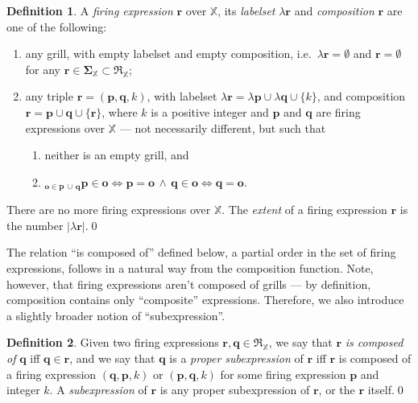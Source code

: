 \documentclass [a4paper,12pt] {article}
\theoremstyle{definition}
\newtheorem{definition}{Definition}[section]
\newcommand{\Forall}{}
\DeclareRobustCommand{\Forall}{\displaystyle\mathop{\textstyle\mathlarger{\forall}}}
\newcommand{\composition}{}
\DeclareRobustCommand{\composition}{\mathop{\textstyle\mathsmaller{\bf {Com}}}}
\begin{document}
\begin {definition}\label{def-expression}
  A {\em firing expression} $\bm{r}$ over ${\mathbb X}$, its {\em
    labelset}\/ $\lambda\bm{r}$ and {\em composition}\/
  $\composition\bm{r}$ are one of the following:
  \begin {enumerate}
  \item any grill, with empty labelset and empty composition,
    i.e.\ $\lambda{\bm{r}} = \emptyset$ and $\composition{\bm{r}} =
    \emptyset$ for any $\bm{r} \in \bm{\Sigma}_{\mathbb X} \subset
    \mathfrak{R}_{\mathbb X}$;
  \item any triple $\bm{r} = (\bm{p}, \bm{q}, k)$, with labelset
    $\lambda{\bm{r}} = \lambda\bm{p} \cup \lambda\bm{q} \cup \{k\}$,
    and composition $\composition{\bm{r}} = \composition\bm{p} \cup
    \composition\bm{q} \cup \{\bm{r}\}$, where $k$ is a positive
    integer and $\bm{p}$ and $\bm{q}$ are firing expressions over
    ${\mathbb X}$ --- not necessarily different, but such that
    \begin {enumerate}
    \item neither is an empty grill, and
    \item $\Forall_{\bm{o} \in
      \composition\bm{p}\,\cup\,\composition\bm{q}} \bm{p} \in
      \composition\bm{o} \iff \bm{p} = \bm{o} \,\wedge\, \bm{q} \in
      \composition\bm{o} \iff \bm{q} = \bm{o}$.
    \end {enumerate}
  \end {enumerate}
  There are no more firing expressions over ${\mathbb X}$.  The {\em
    extent}\/ of a firing expression $\bm{r}$ is the number
  $|\lambda\bm{r}|$.\qed
\end {definition}

The relation ``is composed of'' defined below, a partial order in the
set of firing expressions, follows in a natural way from the
composition function.  Note, however, that firing expressions aren't
composed of grills --- by definition, composition contains only
``composite'' expressions.  Therefore, we also introduce a slightly
broader notion of ``subexpression''.

\begin {definition}\label{def-subexpression}
  Given two firing expressions $\bm{r}, \bm{q} \in
  \mathfrak{R}_{\mathbb X}$, we say that $\bm{r}$ {\em is composed
    of}\/ $\bm{q}$ iff $\bm{q} \in \composition{\bm{r}}$, and we say
  that $\bm{q}$ is a {\em proper subexpression}\/ of $\bm{r}$ iff
  $\bm{r}$ is composed of a firing expression $(\bm{q}, \bm{p}, k)$ or
  $(\bm{p}, \bm{q}, k)$ for some firing expression $\bm{p}$ and
  integer $k$.  A {\em subexpression}\/ of $\bm{r}$ is any proper
  subexpression of $\bm{r}$, or the $\bm{r}$ itself.\qed
\end {definition}
\end{document}
